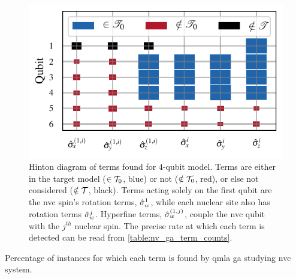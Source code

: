 \begin{figure}
    \begin{center}
        \includegraphics{experimental_study/figures/nv_gen_alg_hinton.pdf}
    \end{center}
    \caption[Hinton diagram of terms found for $4$-qubit  model]{
        Hinton diagram of terms found for $4$-qubit  model.
        Terms are either in the target model ($\in { \mathcal{T} }_0$, blue) or not ($\notin { \mathcal{T} }_0$, red), 
        or else not considered ($\notin { \mathcal{T} }$, black). 
        Terms acting solely on the first qubit are the \gls{nvc} spin's rotation terms, $\hat{\sigma}_w^1$,
            while each nuclear site also has rotation terms $\hat{\sigma}_w^j$.
            Hyperfine terms, $\hat{\sigma}_w^{(1,j)}$, couple the \gls{nvc} qubit with the $j^{th}$ nuclear spin. 
            The precise rate at which each term is detected can be read from \cref{table:nv_ga_term_counts}. 
        }
    \label{fig:nv_ga_hinton}
\end{figure}

\begin{table}
    \begin{center}
        
    \end{center}
    \caption[Percentage of instances for which each term is found by \gls{qmla} \gls{ga} studying \gls{nvc} system.]{
        Percentage of instances for which each term is found by \gls{qmla} \gls{ga} studying \gls{nvc} system.
    }
    \label{table:nv_ga_term_counts}
\end{table}